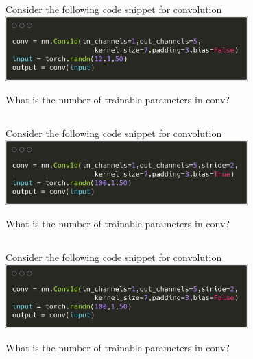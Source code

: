 \begin{frame}
\section{}
Consider the following code snippet for convolution
\includegraphics[width=0.7\textwidth]{images/quiz_4_4_4_4.png}


    What is the number of trainable parameters in conv?



\end{frame}


\begin{frame}
\section{}
Consider the following code snippet for convolution
\includegraphics[width=0.7\textwidth]{images/quiz_4_4_4_5.png}

What is the number of trainable parameters in conv?



\end{frame}

\begin{frame}
\section{}
Consider the following code snippet for convolution
\includegraphics[width=0.7\textwidth]{images/quiz_4_4_4_6.png}

What is the number of trainable parameters in conv?



\end{frame}
